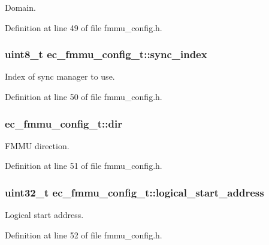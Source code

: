\-Domain. 



\-Definition at line 49 of file fmmu\-\_\-config.\-h.

\subsubsection[{sync\-\_\-index}]{\setlength{\rightskip}{0pt plus 5cm}uint8\-\_\-t {\bf ec\-\_\-fmmu\-\_\-config\-\_\-t\-::sync\-\_\-index}}\label{structec__fmmu__config__t_aa77d8e55cd99d08955d2566fc2ab4eec}


\-Index of sync manager to use. 



\-Definition at line 50 of file fmmu\-\_\-config.\-h.

\subsubsection[{dir}]{ {\bf ec\-\_\-fmmu\-\_\-config\-\_\-t\-::dir}}\label{structec__fmmu__config__t_af157af45ceab69c17a76a02c342fd164}


\-F\-M\-M\-U direction. 



\-Definition at line 51 of file fmmu\-\_\-config.\-h.

\subsubsection[{logical\-\_\-start\-\_\-address}]{\setlength{\rightskip}{0pt plus 5cm}uint32\-\_\-t {\bf ec\-\_\-fmmu\-\_\-config\-\_\-t\-::logical\-\_\-start\-\_\-address}}\label{structec__fmmu__config__t_a04092cc6d2d3d1c5a4d1703265e414cc}


\-Logical start address. 



\-Definition at line 52 of file fmmu\-\_\-config.\-h.

